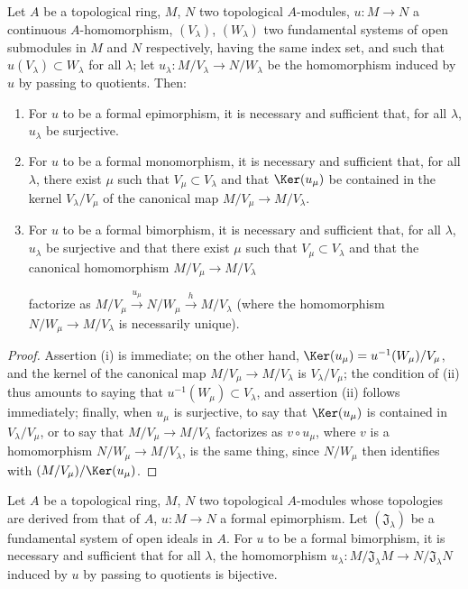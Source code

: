 \begin{proposition}[19.1.3]
\label{0.19.1.3}
Let $A$ be a topological ring, $M$, $N$ two topological $A$-modules, $u:M\to N$ a continuous $A$-homomorphism, $(V_\lambda)$, $(W_\lambda)$ two fundamental systems of open submodules in $M$ and $N$ respectively, having the same index set, and such that $u(V_\lambda)\subset W_\lambda$ for all $\lambda$;
let $u_\lambda:M/V_\lambda\to N/W_\lambda$ be the homomorphism induced by $u$ by passing to quotients.
Then:
\begin{enumerate}
  \item[(i)] For $u$ to be a formal epimorphism, it is necessary and sufficient that, for all $\lambda$, $u_\lambda$ be surjective.
  \item[(ii)] For $u$ to be a formal monomorphism, it is necessary and sufficient that, for all $\lambda$, there exist $\mu$ such that $V_\mu\subset V_\lambda$ and that $\Ker(u_\mu)$ be contained in the kernel $V_\lambda/V_\mu$ of the canonical map $M/V_\mu\to M/V_\lambda$.
  \item[(iii)] For $u$ to be a formal bimorphism, it is necessary and sufficient that, for all $\lambda$, $u_\lambda$ be surjective and that there exist $\mu$ such that $V_\mu\subset V_\lambda$ and that the canonical homomorphism $M/V_\mu\to M/V_\lambda$


  factorize as $M/V_\mu\xrightarrow{u_\mu}N/W_\mu\xrightarrow{h}M/V_\lambda$ (where the homomorphism $N/W_\mu\to M/V_\lambda$ is necessarily unique).
\end{enumerate}
\end{proposition}

\begin{proof}
Assertion (i) is immediate;
on the other hand, $\Ker(u_\mu)=u^{-1}(W_\mu)/V_\mu$, and the kernel of the canonical map $M/V_\mu\to M/V_\lambda$ is $V_\lambda/V_\mu$;
the condition of (ii) thus amounts to saying that $u^{-1}(W_\mu)\subset V_\lambda$, and assertion (ii) follows immediately;
finally, when $u_\mu$ is surjective, to say that $\Ker(u_\mu)$ is contained in $V_\lambda/V_\mu$, or to say that $M/V_\mu\to M/V_\lambda$ factorizes as $v\circ u_\mu$, where $v$ is a homomorphism $N/W_\mu\to M/V_\lambda$, is the same thing, since $N/W_\mu$ then identifies with $(M/V_\mu)/\Ker(u_\mu)$.
\end{proof}

\begin{corollary}[19.1.4]
\label{0.19.1.4}
Let $A$ be a topological ring, $M$, $N$ two topological $A$-modules whose topologies are derived from that of $A$, $u:M\to N$ a formal epimorphism.
Let $(\mathfrak{J}_\lambda)$ be a fundamental system of open ideals in $A$.
For $u$ to be a formal bimorphism, it is necessary and sufficient that for all $\lambda$, the homomorphism $u_\lambda:M/\mathfrak{J}_\lambda M\to N/\mathfrak{J}_\lambda N$ induced by $u$ by passing to quotients is bijective.
\end{corollary}


